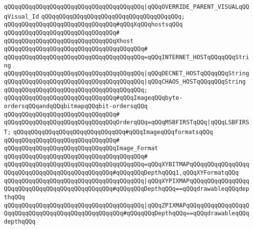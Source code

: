 \verb|qQQqqQQqqQQqqQQqqQQqqQQqqQQqqQQqqQQqqQQq|\verb#|qQQqOVERRIDE_PARENT_VISUALqQQqVisual_Id#\newline
\verb|qQQqqQQqqQQqqQQqqQQqqQQqqQQqqQQqqQQqqQQq;|\newline
\newline
\verb|qQQqqQQqqQQqqQQqqQQqqQQqqQQqqQQq#qQQqXqQQqhostsqQQq|\newline
\verb|qQQqqQQqqQQqqQQqqQQqqQQqqQQqqQQq#|\newline
\verb|qQQqqQQqqQQqqQQqqQQqqQQqqQQqqQQqXhost|\newline
\verb|qQQqqQQqqQQqqQQqqQQqqQQqqQQqqQQqqQQqqQQq#|\newline
\verb|qQQqqQQqqQQqqQQqqQQqqQQqqQQqqQQqqQQqqQQq=qQQqINTERNET_HOSTqQQqqQQqString|\newline
\verb|qQQqqQQqqQQqqQQqqQQqqQQqqQQqqQQqqQQqqQQq|\verb#|qQQqDECNET_HOSTqQQqqQQqString#\newline
\verb|qQQqqQQqqQQqqQQqqQQqqQQqqQQqqQQqqQQqqQQq|\verb#|qQQqCHAOS_HOSTqQQqqQQqString#\newline
\verb|qQQqqQQqqQQqqQQqqQQqqQQqqQQqqQQqqQQqqQQq;|\newline
\newline
\verb|qQQqqQQqqQQqqQQqqQQqqQQqqQQqqQQq#qQQqImageqQQqbyte-ordersqQQqandqQQqbitmapqQQqbit-ordersqQQq|\newline
\verb|qQQqqQQqqQQqqQQqqQQqqQQqqQQqqQQq#|\newline
\verb|qQQqqQQqqQQqqQQqqQQqqQQqqQQqqQQqOrderqQQq=qQQqMSBFIRSTqQQq|\verb#|qQQqLSBFIRST;#\newline
\newline
\verb|qQQqqQQqqQQqqQQqqQQqqQQqqQQqqQQq#qQQqImageqQQqformatsqQQq|\newline
\verb|qQQqqQQqqQQqqQQqqQQqqQQqqQQqqQQq#|\newline
\verb|qQQqqQQqqQQqqQQqqQQqqQQqqQQqqQQqImage_Format|\newline
\verb|qQQqqQQqqQQqqQQqqQQqqQQqqQQqqQQqqQQqqQQq#|\newline
\verb|qQQqqQQqqQQqqQQqqQQqqQQqqQQqqQQqqQQqqQQq=qQQqXYBITMAPqQQqqQQqqQQqqQQqqQQqqQQqqQQqqQQqqQQqqQQqqQQqqQQq#qQQqqQQqDepthqQQq1,qQQqXYFormatqQQq|\newline
\verb|qQQqqQQqqQQqqQQqqQQqqQQqqQQqqQQqqQQqqQQq|\verb#|qQQqXYPIXMAPqQQqqQQqqQQqqQQqqQQqqQQqqQQqqQQqqQQqqQQqqQQqqQQq#\verb|#qQQqqQQqDepthqQQq==qQQqdrawableqQQqdepthqQQq|\newline
\verb|qQQqqQQqqQQqqQQqqQQqqQQqqQQqqQQqqQQqqQQq|\verb#|qQQqZPIXMAPqQQqqQQqqQQqqQQqqQQqqQQqqQQqqQQqqQQqqQQqqQQqqQQqqQQq#\verb|#qQQqqQQqDepthqQQq==qQQqdrawableqQQqdepthqQQq|\newline
